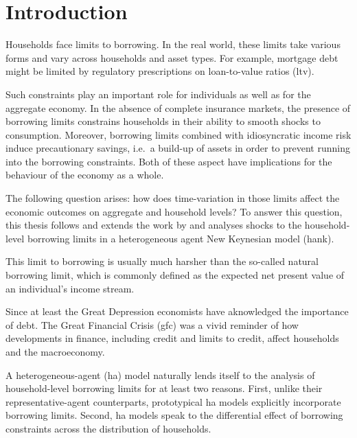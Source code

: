\documentclass[12pt]{article}
\numberwithin{equation}{section} %
\begin{document}
\newpage
{} %
\pagestyle{fancy}
\fancyhf{}
\fancyhead[C]{\leftmark}
\fancyfoot[C]{\thepage}
\thispagestyle{plain}
\section{Introduction}
\label{sec:introduction}

Households face limits to borrowing. In the real world, these limits take various forms and vary across households and asset types. For example, mortgage debt might be limited by regulatory prescriptions on loan-to-value ratios (\Gls{ltv}). 

Such constraints play an important role for individuals as well as for the aggregate economy. In the absence of complete insurance markets, the presence of borrowing limits constrains households in their ability to smooth shocks to consumption. Moreover, borrowing limits combined with idiosyncratic income risk induce precautionary savings, i.e.~a build-up of assets in order to prevent running into the borrowing constraints. Both of these aspect have implications for the behaviour of the economy as a whole. 

The following question arises: how does time-variation in those limits affect the economic outcomes on aggregate and household levels? To answer this question, this thesis follows and extends the work by \textcite{gl2017} and analyses shocks to the household-level borrowing limits in a heterogeneous agent New Keynesian model (\Gls{hank}).

This limit to borrowing is usually much harsher than the so-called natural borrowing limit, which is commonly defined as the expected net present value of an individual's income stream. 

Since at least the Great Depression economists have aknowledged the importance of debt. The Great Financial Crisis (\Gls{gfc}) was a vivid reminder of how developments in finance, including credit and limits to credit, affect households and the macroeconomy. 

A heterogeneous-agent (\Gls{ha}) model naturally lends itself to the analysis of household-level borrowing limits for at least two reasons. First, unlike their representative-agent counterparts, prototypical \Gls{ha} models explicitly incorporate borrowing limits. Second, \Gls{ha} models speak to the differential effect of borrowing constraints across the distribution of households.
\end{document}

